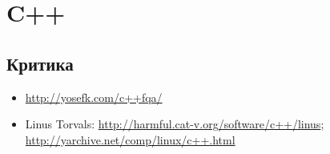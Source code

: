 \chapter{C++}





\section{Критика}

\begin{itemize}

\item
\url{http://yosefk.com/c++fqa/}

\item
Linus Torvals: \url{http://harmful.cat-v.org/software/c++/linus}; \url{http://yarchive.net/comp/linux/c++.html}

\end{itemize}

